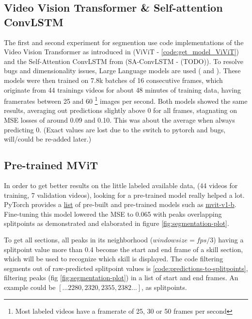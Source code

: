 \subsection{Video Vision Transformer \& Self-attention ConvLSTM}
\label{subsec:video-models-from-scratch}

The first and second experiment for segmention use code implementations of the Video Vision Transformer as introduced in \textcite{Arnab2021} (ViViT - \ref{code:get_model_ViViT}) and the Self-Attention ConvLSTM from \textcite{Lin_2020} (SA-ConvLSTM - (TODO)).
To resolve bugs and dimensionality issues, Large Language models are used (\autocite{OpenAI_ChatGPT_2025} and \autocite{Deepseek_2025}).
These models were then trained on 7.8k batches of 16 consecutive frames, which originate from 44 trainings videos for about 48 minutes of training data, having framerates between 25 and 60 \footnote{Most labeled videos have a framerate of 25, 30 or 50 frames per second} images per second.
Both models showed the same results, averaging out predictions slightly above 0 for all frames, stagnating on MSE losses of around 0.09 and 0.10. This was about the average when always predicting 0. (Exact values are lost due to the switch to pytorch and bugs, will/could be re-added later.)

\subsection{Pre-trained MViT}

In order to get better results on the little labeled available data, (44 videos for training, 7 validation videos), looking for a pre-trained model really helped a lot.
PyTorch provides a \href{https://pytorch.org/vision/main/models.html}{list} of pre-built and pre-trained models such as \href{https://pytorch.org/vision/main/models/video_mvit.html}{mvit-v1-b}.
Fine-tuning this model lowered the MSE to 0.065 with peaks overlapping splitpoints as demonstrated and elaborated in figure \ref{fig:segmentation-plot}.

To get all sections, all peaks in its neighborhood (\(windowsize = fps / 3\)) having a splitpoint value more than 0.4 become the start and end frame of a skill section, which will be used to recognize which skill is displayed. The code filtering segments out of raw-predicted splitpoint values is \ref{code:predictions-to-splitpoints}, filtering peaks (fig  \ref{fig:segmentation-plot}) in a list of start and end frames. An example could be \([...2280, 2320, 2355, 2382...]\), as splitpoints.


